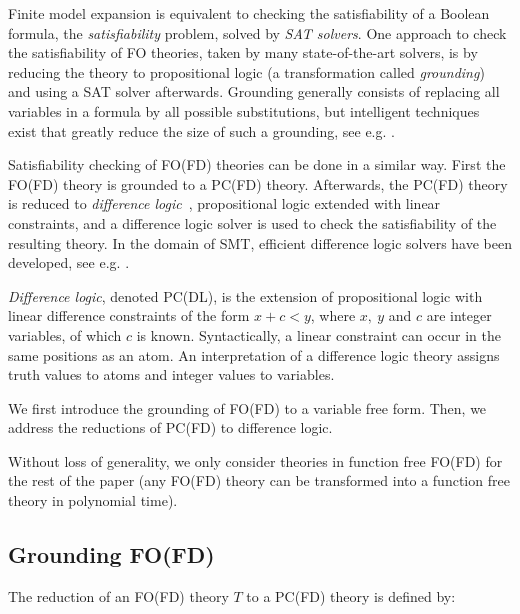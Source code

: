 \documentclass{tlp}
\begin{document}
Finite model expansion is equivalent to checking the satisfiability of a Boolean formula, the {\em satisfiability} problem, solved by \emph{SAT solvers}. One approach to check the satisfiability of FO theories, taken by many state-of-the-art solvers, is by reducing the theory to propositional logic (a transformation called \emph{grounding}) and using a SAT solver afterwards. Grounding generally consists of replacing all variables in a formula by all possible substitutions, but intelligent techniques exist that greatly reduce the size of such a grounding, see e.g. \cite{aaai/WittocxMD08}.

Satisfiability checking of FO(FD) theories can be done in a similar way. First the FO(FD) theory is grounded to a PC(FD) theory. Afterwards, the PC(FD) theory is reduced to \emph{difference logic}~\cite{cav/NieuwenhuisO05}, propositional logic extended with linear constraints, and a difference logic solver is used to check the satisfiability of the resulting theory. In the domain of SMT, efficient difference logic solvers have been developed, see e.g. \cite{sat/cotton06}.

\emph{Difference logic}, denoted PC(DL), is the extension of propositional logic with linear difference constraints of the form $x + c < y$, where $x,~y$ and $c$ are integer variables, of which $c$ is known. Syntactically, a linear constraint can occur in the same positions as an atom. An interpretation of a difference logic theory assigns truth values to atoms and integer values to variables.

We first introduce the grounding of FO(FD) to a variable free form. Then, we address the reductions of PC(FD) to difference logic. 

Without loss of generality, we only consider theories in function free FO(FD) for the rest of the paper (any FO(FD) theory can be transformed into a function free theory in polynomial time). 

\subsection{Grounding FO(FD)}
The reduction of an FO(FD) theory $T$ to a PC(FD) theory is defined by:
\end{document}
